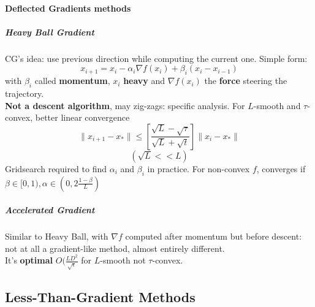 \documentclass[10pt]{report}
\begin{document}
\paragraph{Deflected Gradients methods} 
\subparagraph{Heavy Ball Gradient} CG's idea: use previous direction while computing the current one. Simple form: $$x_{i+1} = x_i - \alpha_i\nabla f(x_i) + \beta_i(x_i-x_{i-1})$$ with $\beta_i$ called \textbf{momentum}, $x_i$ \textbf{heavy} and $\nabla f(x_i)$ the \textbf{force} steering the trajectory.\\
\textbf{Not a descent algorithm}, may zig-zags: specific analysis. For $L$-smooth and $\tau$-convex, better linear convergence
$$\|x_{i+1} - x_*\|\leq\left[\frac{\sqrt{L} - \sqrt{\tau}}{\sqrt{L} + \sqrt{t}}\right]\|x_i-x_*\|$$ $$(\sqrt{L}<<L)$$
Gridsearch required to find $\alpha_i$ and $\beta_i$ in practice. For non-convex $f$, converges if $\beta\in[0,1), \alpha\in(0,2\frac{1-\beta}{L})$
\subparagraph{Accelerated Gradient} Similar to Heavy Ball, with $\nabla f$ computed after momentum but before descent: not at all a gradient-like method, almost entirely different.\\
It's \textbf{optimal} $O(\frac{LD^2}{\sqrt{\epsilon}}$ for $L$-smooth not $\tau$-convex.
\subsection{Less-Than-Gradient Methods}
\end{document}
